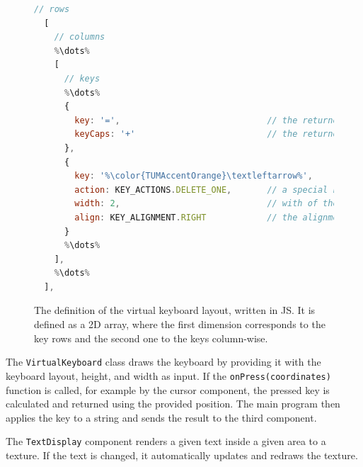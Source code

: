 \begin{figure}[H]
  \begin{lstlisting}[language=JavaScript]
  // rows
  [
    // columns
    %\dots%
    [ 
      // keys
      %\dots%
      {
        key: '=',                             // the returned character if no action is present otherwise just a label
        keyCaps: '+'                          // the returned character if in caps mode 
      },
      {
        key: '%\color{TUMAccentOrange}\textleftarrow%',
        action: KEY_ACTIONS.DELETE_ONE,       // a special key action; in this case, it deletes the last character
        width: 2,                             // with of the key
        align: KEY_ALIGNMENT.RIGHT            // the alignment of the label on the key
      }
      %\dots%
    ],
    %\dots%
  ],
  \end{lstlisting}
  \caption[Virtual keyboard layout definition]{The definition of the virtual keyboard layout, written in \ac{JS}. It is defined as a \ac{2D} array, where the first dimension corresponds to the key rows and the second one to the keys column-wise.}\label{fig:virtual-keyboard-layout}
\end{figure}

The \lstinline{VirtualKeyboard} class draws the keyboard by providing it with the keyboard layout, height, and width as input. If the \lstinline{onPress(coordinates)} function is called, for example by the cursor component, the pressed key is calculated and returned using the provided position. The main program then applies the key to a string and sends the result to the third component. %

The \lstinline{TextDisplay} component renders a given text inside a given area to a texture. If the text is changed, it automatically updates and redraws the texture.